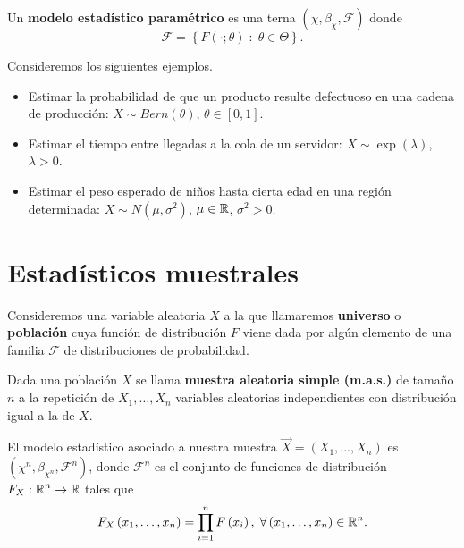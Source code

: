\begin{definition}
Un \textbf{modelo estadístico paramétrico} es una terna $\displaystyle \left(\chi, \beta_{\chi}, \mathcal{F}\right) $ donde 
\[\mathcal{F}= \left\{ F\left( \cdot; \theta \right) \; : \; \theta \in \Theta\right\}  .\]
\end{definition}
\begin{eg}
Consideremos los siguientes ejemplos.
\begin{itemize}
	\item Estimar la probabilidad de que un producto resulte defectuoso en una cadena de producción: $\displaystyle X \sim Bern\left(\theta\right) $, $\displaystyle \theta \in \left[0,1\right]  $.
	\item Estimar el tiempo entre llegadas a la cola de un servidor: $\displaystyle X \sim \exp\left(\lambda \right) $, $\displaystyle \lambda > 0 $.
	\item Estimar el peso esperado de niños hasta cierta edad en una región determinada: $\displaystyle X \sim N\left(\mu, \sigma^{2}\right) $, $\displaystyle \mu \in \mathbb{R} $, $\displaystyle \sigma^{2} > 0 $. 
\end{itemize}
\end{eg}

\section{Estadísticos muestrales}
Consideremos una variable aleatoria $\displaystyle X $ a la que llamaremos \textbf{universo} o \textbf{población} cuya función de distribución $\displaystyle F $ viene dada por algún elemento de una familia $\displaystyle \mathcal{F} $ de distribuciones de probabilidad.
\begin{definition}
Dada una población $\displaystyle X $ se llama \textbf{muestra aleatoria simple (m.a.s.)} de tamaño $\displaystyle n $ a la repetición de $\displaystyle X_{1}, \ldots, X_{n} $ variables aleatorias independientes con distribución igual a la de $\displaystyle X $. 
\end{definition}
\begin{observation}
El modelo estadístico asociado a nuestra muestra $\displaystyle \overrightarrow{X} = \left(X_{1}, \ldots, X_{n}\right) $ es $\displaystyle \left(\chi^{n}, \beta_{\chi^{n}}, \mathcal{F}^{n}\right) $, donde $\displaystyle \mathcal{F}^{n} $ es el conjunto de funciones de distribución $\displaystyle F_{X} : \mathbb{R}^{n} \to \mathbb{R} $ tales que 
\[F_{X}\left(x_{1}, \ldots, x_{n}\right)=\prod^{n}_{i=1}F\left(x_{i}\right), \; \forall \left(x_{1}, \ldots, x_{n}\right) \in \mathbb{R}^{n} .\]
\end{observation}

